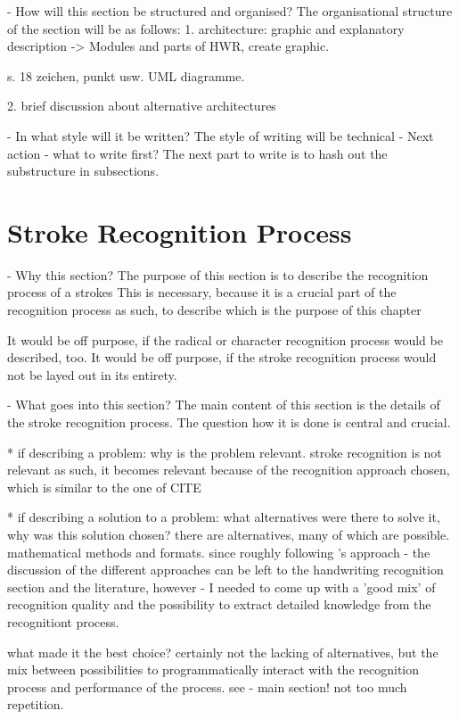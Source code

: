 - How will this section be structured and organised?
  The organisational structure of the section will be as follows:
  1. architecture: graphic and explanatory description
  -> Modules and parts of HWR, create graphic.

  s. 18 zeichen, punkt usw. UML diagramme.
     
  2. brief discussion about alternative architectures

- In what style will it be written?
  The style of writing will be technical
- Next action - what to write first?
  The next part to write is to hash out the substructure in subsections.

\section{Stroke Recognition Process}
\label{sec:hwre:strokerecognitionprocess}

- Why this section? 
  The purpose of this section is to describe the recognition process of a strokes
  This is necessary, because it is a crucial part of the recognition process
  as such, to describe which is the purpose of this chapter

  It would be off purpose, if the radical or character recognition process 
  would be described, too.
  It would be off purpose, if the stroke recognition process would not be 
  layed out in its entirety.

- What goes into this section?
  The main content of this section is the details of the stroke recognition
  process. The question how it is done is central and crucial.

  * if describing a problem: why is the problem relevant.
    stroke recognition is not relevant as such, it becomes relevant because
    of the recognition approach chosen, which is similar to the one of CITE

  * if describing a solution to a problem: what alternatives were
    there to solve it, why was this solution chosen? 
    there are alternatives, many of which are possible. mathematical methods 
    and formats. since roughly following 's
    \citeyear{Nakagawa2008} approach - the discussion of the different 
    approaches can be left to the handwriting recognition section and the 
    literature, however - I needed to come up with a 'good mix' of 
    recognition quality and the possibility to extract detailed knowledge 
    from the recognitiont process.
     
    what made it the best choice? 
    certainly not the lacking of alternatives, but the mix between 
    possibilities to programmatically interact with the recognition process
    and performance of the process.
    see - main section! not too much repetition.

